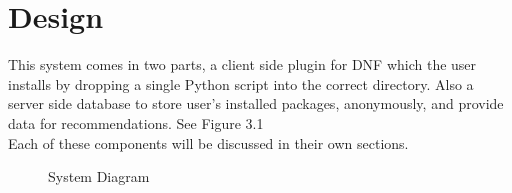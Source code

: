 \documentclass{l4proj}
\begin{document}
 
\chapter{Design}
This system comes in two parts, a client side plugin for DNF which the user installs by dropping a single Python script into the correct directory. Also a server side database to store user's installed packages, anonymously, and provide data for recommendations. See Figure 3.1\\
Each of these components will be discussed in their own sections.
\begin{figure}
\centerline{}
\caption{System Diagram}
\end{figure}
\end{document}
